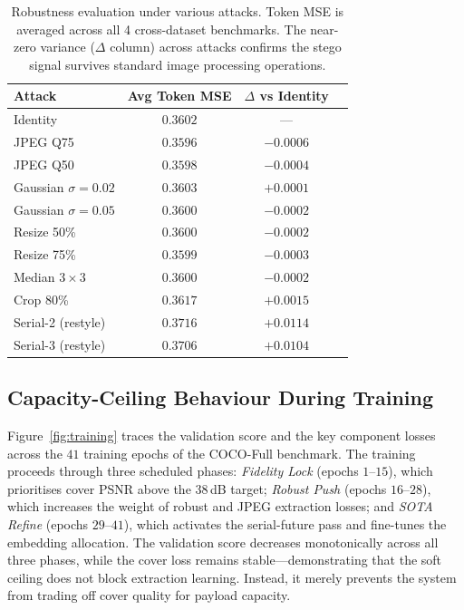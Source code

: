 \documentclass[conference]{IEEEtran}
\begin{document}
\begin{table}[t]
\centering
\caption{Robustness evaluation under various attacks. Token MSE is averaged across all 4 cross-dataset benchmarks. The near-zero variance ($\Delta$ column) across attacks confirms the stego signal survives standard image processing operations.}
\label{tab:robustness}
\begin{tabular}{lccc}
\toprule
\textbf{Attack} & \textbf{Avg Token MSE} & \textbf{$\Delta$ vs Identity} \\
\midrule
Identity       & $0.3602$ & --- \\
JPEG Q75       & $0.3596$ & $-0.0006$ \\
JPEG Q50       & $0.3598$ & $-0.0004$ \\
Gaussian $\sigma{=}0.02$ & $0.3603$ & $+0.0001$ \\
Gaussian $\sigma{=}0.05$ & $0.3600$ & $-0.0002$ \\
Resize 50\%    & $0.3600$ & $-0.0002$ \\
Resize 75\%    & $0.3599$ & $-0.0003$ \\
Median $3{\times}3$ & $0.3600$ & $-0.0002$ \\
Crop 80\%      & $0.3617$ & $+0.0015$ \\
\midrule
Serial-2 (restyle) & $0.3716$ & $+0.0114$ \\
Serial-3 (restyle) & $0.3706$ & $+0.0104$ \\
\bottomrule
\end{tabular}
\end{table}

\subsection{Capacity-Ceiling Behaviour During Training}
Figure~\ref{fig:training} traces the validation score and the key component losses across the $41$ training epochs of the COCO-Full benchmark. The training proceeds through three scheduled phases: \emph{Fidelity Lock} (epochs $1$--$15$), which prioritises cover PSNR above the $38$\,dB target; \emph{Robust Push} (epochs $16$--$28$), which increases the weight of robust and JPEG extraction losses; and \emph{SOTA Refine} (epochs $29$--$41$), which activates the serial-future pass and fine-tunes the embedding allocation. The validation score decreases monotonically across all three phases, while the cover loss remains stable---demonstrating that the soft ceiling does not block extraction learning. Instead, it merely prevents the system from trading off cover quality for payload capacity.
\end{document}
